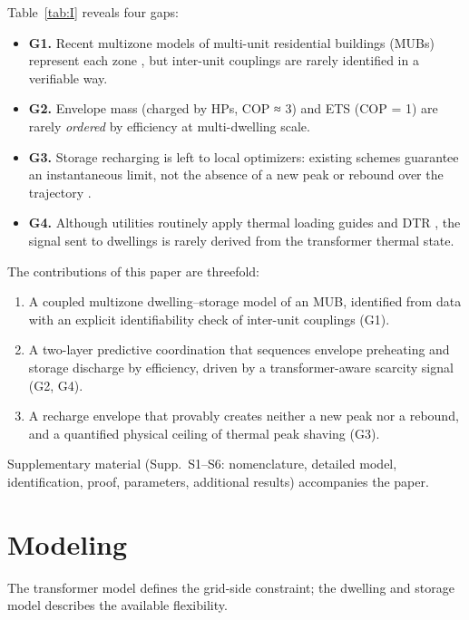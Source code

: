 \documentclass[conference]{IEEEtran}
\begin{document}
Table~\ref{tab:I} reveals four gaps:
\begin{itemize}
\item \textbf{G1.} Recent multizone models of multi-unit residential buildings (MUBs) represent each zone \cite{Frahm2025, Hasrat2025, Bisogno2026}, but inter-unit couplings are rarely identified in a verifiable way.
\item \textbf{G2.} Envelope mass (charged by HPs, COP ≈ 3) and ETS (COP = 1) are rarely \emph{ordered} by efficiency at multi-dwelling scale.
\item \textbf{G3.} Storage recharging is left to local optimizers: existing schemes guarantee an instantaneous limit, not the absence of a new peak or rebound over the trajectory \cite{Hein2026}.
\item \textbf{G4.} Although utilities routinely apply thermal loading guides and DTR \cite{IEEEC5791_2025, Daminov2021}, the signal sent to dwellings is rarely derived from the transformer thermal state.
\end{itemize}
The contributions of this paper are threefold:
\begin{enumerate}
\item A coupled multizone dwelling--storage model of an MUB, identified from data with an explicit identifiability check of inter-unit couplings (G1).
\item A two-layer predictive coordination that sequences envelope preheating and storage discharge by efficiency, driven by a transformer-aware scarcity signal (G2, G4).
\item A recharge envelope that provably creates neither a new peak nor a rebound, and a quantified physical ceiling of thermal peak shaving (G3).
\end{enumerate}
Supplementary material (Supp.~S1--S6: nomenclature, detailed model, identification, proof, parameters, additional results) accompanies the paper.

\section{Modeling}\label{sec:model}

The transformer model defines the grid-side constraint; the dwelling and storage model describes the available flexibility.
\end{document}
